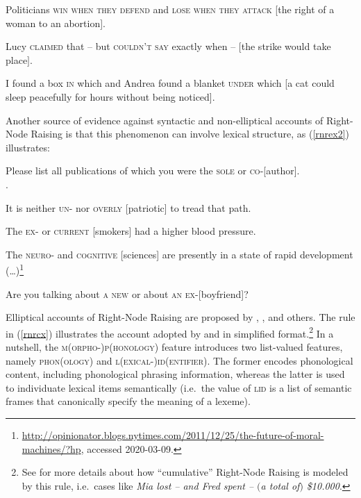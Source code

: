 \documentclass[output=paper
                ,modfonts
                ,nonflat
	        ,collection
	        ,collectionchapter
	        ,collectiontoclongg
 	        ,biblatex
                ,babelshorthands
                ,newtxmath
                ,draftmode
                ,colorlinks, citecolor=brown
]{./langsci/langscibook}
\begin{document}
{\begin{exe}
\begin{xlista}
 \ex Politicians \textsc{win when they defend} and \textsc{lose when they attack}
[the right of a woman to an abortion].

\ex Lucy \textsc{claimed} that -- but \textsc{couldn't say}
exactly when --  $[$the strike would take place$]$.
 
 \ex I found a box \textsc{in} which and Andrea found a blanket \textsc{under}
which [a cat could sleep peacefully for hours without being
noticed].
\end{xlista}\label{rnrex1}
\end{exe}

Another source of evidence against syntactic and non-elliptical accounts of Right-Node Raising is that this phenomenon can involve lexical structure,
as  (\ref{rnrex2}) illustrates:

\begin{exe}
\ex \begin{xlista}
\ex Please list all publications of which you were the \textsc{sole} or
\textsc{co}-[author].\\
 \citep[1325, footnote 44]{rodney}.
 
\ex  It is neither \textsc{un}- nor \textsc{overly} [patriotic] to tread that path.
 
\ex The \textsc{ex-} or \textsc{current} [smokers] had a higher blood pressure.\\
\citep[]{chaveslp} 

\ex The \textsc{neuro}- and \textsc{cognitive} [sciences] are
presently in a state of rapid development
(\ldots{})\footnote{\url{http://opinionator.blogs.nytimes.com/2011/12/25/the-future-of-moral-machines/?hp},
  accessed 2020-03-09.}

\ex Are you talking about \textsc{a new}  or about \textsc{an ex}-[boyfriend]?\\
\citep[867]{chavesrnr}

\end{xlista}\label{rnrex2}
\end{exe}



Elliptical accounts of Right-Node Raising are proposed by \citet{Beavers},
\citet{Yatabe:04}, \citet{chavesrnr} and others. The rule in (\ref{rnrcx}) illustrates the account adopted by 
 \citet[874]{chavesrnr}  and \citet[]{aoi}
  in simplified format.\footnote{See \citet{chavesrnr} for more details about how ``cumulative'' Right-Node Raising is modeled by this rule, i.e.\
 cases like \emph{Mia lost -- and Fred spent -- $($a total of$)$ \$10.000}.}
In a nutshell, the \textsc{m(orpho-)p(honology)} feature introduces two list-valued features, namely \textsc{phon}(\textsc{ology}) and \textsc{l(exical-)id(entifier)}. The former encodes phonological content, including phonological phrasing information,  whereas the latter is used to individuate lexical items semantically (i.e.\  the value
of \textsc{lid} is a list of semantic frames that canonically specify the meaning of a lexeme).

}
\end{document}
